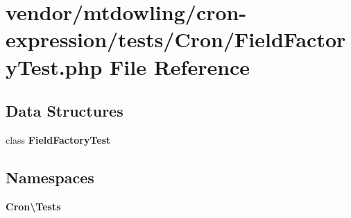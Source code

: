 \section{vendor/mtdowling/cron-\/expression/tests/\+Cron/\+Field\+Factory\+Test.php File Reference}
\label{_field_factory_test_8php}
\subsection*{Data Structures}
\begin{DoxyCompactItemize}
\item 
class {\bf Field\+Factory\+Test}
\end{DoxyCompactItemize}
\subsection*{Namespaces}
\begin{DoxyCompactItemize}
\item 
 {\bf Cron\textbackslash{}\+Tests}
\end{DoxyCompactItemize}

